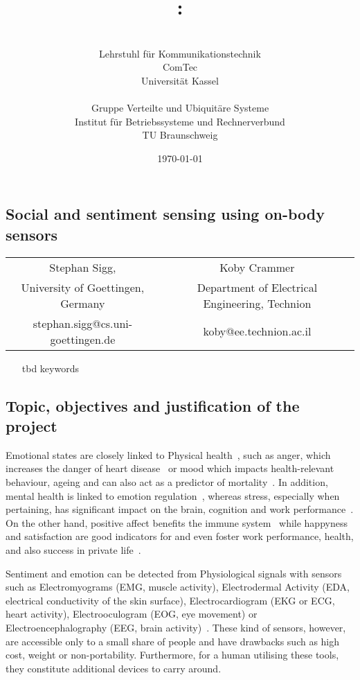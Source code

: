 \documentclass[12pt]{article}
\author{\begin{minipage}[t]{7.1cm}\centering \small \VornameAntragstellerA\ \NachnameAntragstellerA\\ \small Lehrstuhl für Kommunikationstechnik\\ \small ComTec\\ \small Universität Kassel\end{minipage}
\begin{minipage}[t]{7.1cm}\centering \small \VornameAntragstellerB\ \NachnameAntragstellerB\\ \small Gruppe Verteilte und Ubiquitäre Systeme \\ \small Institut für Betriebssysteme und Rechnerverbund\\ \small TU Braunschweig\end{minipage}}
\title{\projektname:\\\notiz{Social and sentiment sensing using on-body sensors}}
\date{\small \today}
\begin{document}
\onehalfspacing %
\setcounter{secnumdepth}{5}
\pagebreak
\begin{center}
\section*{Social and sentiment sensing using on-body sensors}
\begin{tabular}{cc}
  Stephan Sigg, & Koby Crammer\\
  University of Goettingen, Germany & Department of Electrical Engineering, Technion \\
 stephan.sigg@cs.uni-goettingen.de & koby@ee.technion.ac.il
\end{tabular}
\end{center}
\begin{itemize}
 \item[\color{blue}tbd] keywords
\end{itemize}

\subsection*{Topic, objectives and justification of the project}
Emotional states are closely linked to Physical health~\cite{SentimentSensing_Salovey_2000}, such as anger, which increases the danger of heart disease~\cite{SentimentSensing_Smith_2004} or mood which impacts health-relevant behaviour, ageing and can also act as a predictor of mortality~\cite{SentimentSensing_Todaro_2003}.
In addition, mental health is linked to emotion regulation~\cite{SentimentSensing_Gross_1995}, whereas stress, especially when pertaining, has significant impact on the brain, cognition and work performance~\cite{SentimentSensing_Lupien_2009}.
On the other hand, positive affect benefits the immune system~\cite{SentimentSensing_Smith_2004} while happyness and satisfaction are good indicators for and even foster work performance, health, and also success in private life~\cite{SentimentSensing_Lyubomirsky_2005}.

Sentiment and emotion can be detected from Physiological signals with sensors such as Electromyograms (EMG, muscle activity), Electrodermal Activity (EDA, electrical conductivity of the skin surface), Electrocardiogram (EKG or ECG, heart activity), Electrooculogram (EOG, eye movement) or Electroencephalography (EEG, brain activity)~\cite{SentimentSensing_Calvo_2010}.
These kind of sensors, however, are accessible only to a small share of people and have drawbacks such as high cost, weight or non-portability. 
Furthermore, for a human utilising these tools, they constitute additional devices to carry around.
\end{document}
